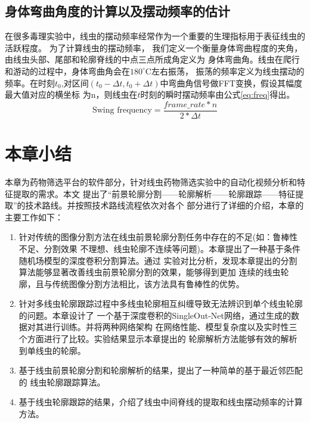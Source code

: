 \subsection{身体弯曲角度的计算以及摆动频率的估计}
	在很多毒理实验中，线虫的摆动频率经常作为一个重要的生理指标用于表征线虫的活跃程度\cite{Wang2008Assessment}。
	为了计算线虫的摆动频率， 我们定义一个衡量身体弯曲程度的夹角，由线虫头部、尾部和轮廓脊线的中点三点所成角定义为
	身体弯曲角。线虫在爬行和游动的过程中，身体弯曲角会在$180^\circ$C左右振荡，
	振荡的频率定义为线虫摆动的频率。在时刻$t_0$,对区间$(t_0-\Delta t,t_0+\Delta t)$中弯曲角信号做FFT变换，假设其幅度最大值对应的横坐标
	为n，则线虫在$t$时刻的瞬时摆动频率由公式\ref{eq:freq}得出。
	\begin{equation}
        \text{Swing frequency}=\frac{frame\_rate*n}{2*\Delta t} \label{eq:freq}
	\end{equation}
		
\section{本章小结}
	本章为药物筛选平台的软件部分，针对线虫药物筛选实验中的自动化视频分析和特征提取的需求。本文
	提出了“前景轮廓分割——轮廓解析——轮廓跟踪——特征提取”的技术路线。并按照技术路线流程依次对各个
	部分进行了详细的介绍，本章的主要工作如下：
	\begin{enumerate}[label={(\arabic*)},font={\color{black!50!black}\bfseries}]
	  \item 针对传统的图像分割方法在线虫前景轮廓分割任务中存在的不足(如：鲁棒性不足、分割效果
	  不理想、线虫轮廓不连续等问题)。本章提出了一种基于条件随机场模型的深度卷积分割算法。通过
	  实验对比分析，发现本章提出的分割算法能够显著改善线虫前景轮廓分割的效果，能够得到更加
	  连续的线虫轮廓，且与传统图像分割方法相比，该方法具有鲁棒性的优势。
	  \item 针对多线虫轮廓跟踪过程中多线虫轮廓相互纠缠导致无法辨识到单个线虫轮廓的问题。本章设计了
	  一个基于深度卷积的SingleOut-Net网络，通过生成的数据对其进行训练。并将两种网络架构
	  在网络性能、模型复杂度以及实时性三个方面进行了比较。实验结果显示本章提出的
	  轮廓解析方法能够有效的解析到单线虫的轮廓。
	  \item 基于线虫前景轮廓分割和轮廓解析的结果，提出了一种简单的基于最近邻匹配的
	  线虫轮廓跟踪算法。
	  \item 基于线虫轮廓跟踪的结果，介绍了线虫中间脊线的提取和线虫摆动频率的计算方法。
	\end{enumerate}